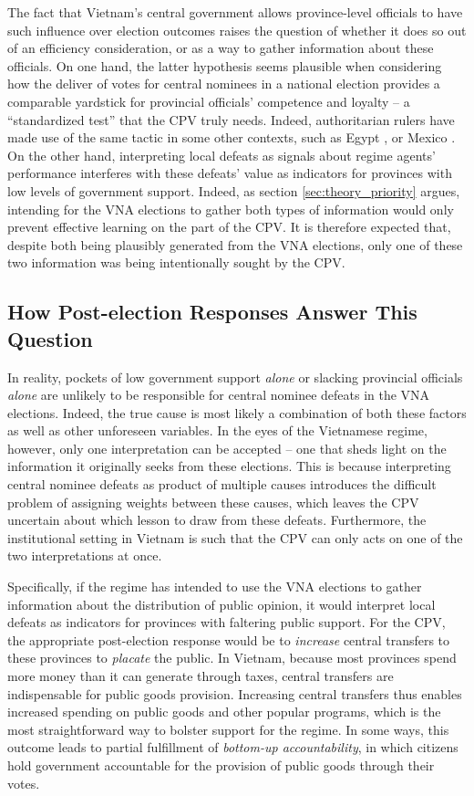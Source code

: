 \documentclass[12pt]{article}
\newcommand{\1}{\mathbbm{1}}
\begin{document}
The fact that Vietnam's central government allows province-level officials to have such influence over election outcomes raises the question of whether it does so out of an efficiency consideration, or as a way to gather information about these officials. On one hand, the latter hypothesis seems plausible when considering how the deliver of votes for central nominees in a national election provides a comparable yardstick for provincial officials' competence and loyalty -- a ``standardized test'' that the CPV truly needs. Indeed, authoritarian rulers have made use of the same tactic in some other contexts, such as Egypt \citep{Blaydes2008}, or Mexico \citep{Magaloni2006, Larreguy2016}. On the other hand, interpreting local defeats as signals about regime agents' performance interferes with these defeats' value as indicators for provinces with low levels of government support. Indeed, as section \ref{sec:theory_priority} argues, intending for the VNA elections to gather both types of information would only prevent effective learning on the part of the CPV. It is therefore expected that, despite both being plausibly generated from the VNA elections, only one of these two information was being intentionally sought by the CPV.


\subsection{How Post-election Responses Answer This Question}
\label{sec:vietnam_responses}

In reality, pockets of low government support \textit{alone} or slacking provincial officials \textit{alone} are unlikely to be responsible for central nominee defeats in the VNA elections. Indeed, the true cause is most likely a combination of both these factors as well as other unforeseen variables. In the eyes of the Vietnamese regime, however, only one interpretation can be accepted -- one that sheds light on the information it originally seeks from these elections. This is because interpreting central nominee defeats as product of multiple causes introduces the difficult problem of assigning weights between these causes, which leaves the CPV uncertain about which lesson to draw from these defeats. Furthermore, the institutional setting in Vietnam is such that the CPV can only acts on one of the two interpretations at once. 

Specifically, if the regime has intended to use the VNA elections to gather information about the distribution of public opinion, it would interpret local defeats as indicators for provinces with faltering public support. For the CPV, the appropriate post-election response would be to  \textit{increase} central transfers to these provinces to \textit{placate} the public. In Vietnam, because most provinces spend more money than it can generate through taxes, central transfers are indispensable for public goods provision. Increasing central transfers thus enables increased spending on public goods and other popular programs, which is the most straightforward way to bolster support for the regime. In some ways, this outcome leads to partial fulfillment of \textit{bottom-up accountability}, in which citizens hold government accountable for the provision of public goods through their votes.
\end{document}
